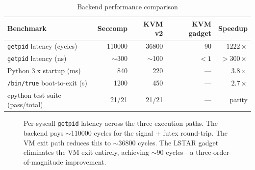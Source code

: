 \begin{table}[ht]
\centering
\caption{Backend performance comparison}
\label{tab:kvm-perf-comparison}
\begin{tabular}{lrrrr}
\toprule
\textbf{Benchmark} & \textbf{Seccomp} & \textbf{KVM v2} & \textbf{KVM gadget} & \textbf{Speedup} \\
\midrule
\texttt{getpid} latency (cycles) & \num{110000} & \num{36800} & \num{90} & $1222\times$ \\
\texttt{getpid} latency (ns)     & $\sim$300    & $\sim$100   & $<1$     & $>300\times$ \\
Python 3.x startup (ms)          & 840          & 220         & ---      & $3.8\times$ \\
\texttt{/bin/true} boot-to-exit (\textmu{}s) & 1200 & 450   & ---      & $2.7\times$ \\
cpython test suite (pass/total)   & 21/21        & 21/21       & ---      & parity \\
\bottomrule
\end{tabular}
\end{table}

\begin{figure}[ht]
\centering
{}
\caption[Per-syscall getpid latency]{%
  Per-syscall \texttt{getpid} latency across the three execution paths.
  The \Seccomp{} backend pays $\sim$\num{110000} cycles for the signal +
  futex round-trip.  The \KVMvTwo{} VM exit path reduces this to
  $\sim$\num{36800} cycles.  The LSTAR gadget eliminates the VM exit
  entirely, achieving $\sim$90 cycles---a three-order-of-magnitude
  improvement.
}
\label{fig:kvm-getpid-perf}
\end{figure}

